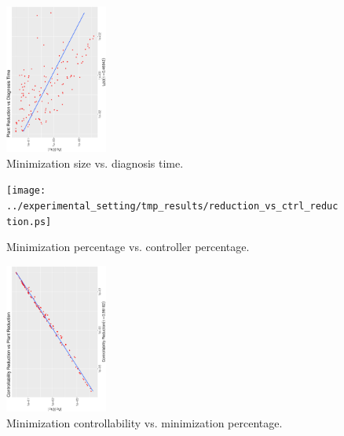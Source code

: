 \begin{figure}[bt]
	\centering
	\SmallPicture
	\includegraphics[width=0.3\textwidth, angle=-90]{../experimental_setting/tmp_results/reduction_vs_diag_time.ps}
	\vspace*{-2mm}
	\caption{Minimization size vs. diagnosis time.}
	\label{fig:reduction_vs_diag_time}
	\vspace*{-4mm}
	\MediumPicture
\end{figure}
\begin{figure}[bt]
	\centering
	\SmallPicture
	\texttt{[image: ../experimental\_setting/tmp\_results/reduction\_vs\_ctrl\_reduction.ps]}
	\vspace*{-2mm}
	\caption{Minimization percentage vs. controller percentage.}
	\label{fig:min_reduction_vs_controller_reduction}
	\vspace*{-4mm}
	\MediumPicture
\end{figure}
\begin{figure}[bt]
	\centering
	\SmallPicture
	\includegraphics[width=0.3\textwidth, angle=-90]{../experimental_setting/tmp_results/min_ctrl_vs_min_pct.ps}
	\vspace*{-2mm}
	\caption{Minimization controllability vs. minimization percentage.}
	\label{fig:min_ctr_vs_min_pct}
	\vspace*{-4mm}
	\MediumPicture
\end{figure}
